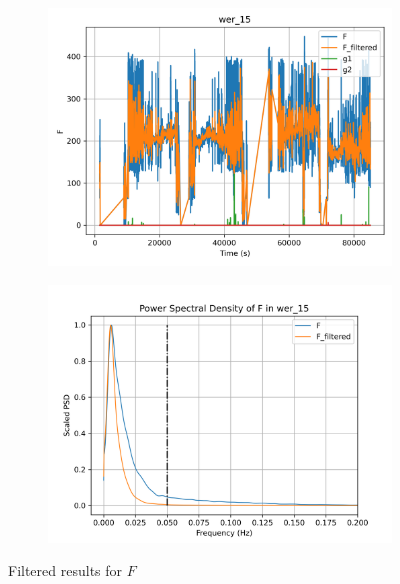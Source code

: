 \begin{figure}[H]

\begin{minipage}{0.49\textwidth}
        \begin{figure}[H]
                \centering
                \includegraphics[width = \textwidth]{./figs/trk_filt/wer_15/F.png}
        \end{figure}
\end{minipage}
\begin{minipage}{0.49\textwidth}
        \begin{figure}[H]
                \centering
                \includegraphics[width = \textwidth]{./figs/trk_filt/wer_15/F_psd.png}
        \end{figure}
\end{minipage}
\caption{Filtered results for $F$}

\end{figure}

